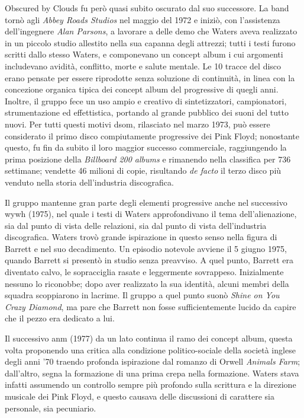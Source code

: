 \documentclass[class=book, crop=false, oneside, 12pt]{standalone}
\begin{document}
    Obscured by Clouds fu però quasi subito oscurato dal suo successore. La band tornò agli \emph{Abbey Roads Studios} nel maggio del 1972 e iniziò, con l'assistenza dell'ingegnere \emph{Alan Parsons}, a lavorare a delle demo che Waters aveva realizzato in un piccolo studio allestito nella sua capanna degli attrezzi; tutti i testi furono scritti dallo stesso Waters, e componevano un concept album i cui argomenti includevano avidità, conflitto, morte e salute mentale. Le 10 tracce del disco erano pensate per essere riprodotte senza soluzione di continuità, in linea con la concezione organica tipica dei concept album del progressive di quegli anni. Inoltre, il gruppo fece un uso ampio e creativo di sintetizzatori, campionatori, strumentazione ed effettistica, portando al grande pubblico dei suoni del tutto nuovi. Per tutti questi motivi \acrfull{dsom}, rilasciato nel marzo 1973, può essere considerato il primo disco compiutamente progressive dei Pink Floyd; nonostante questo, fu fin da subito il loro maggior successo commerciale, raggiungendo la prima posizione della \emph{Billboard 200 albums} e rimanendo nella classifica per 736 settimane; vendette 46 milioni di copie, risultando \emph{de facto} il terzo disco più venduto nella storia dell'industria discografica.

    Il gruppo mantenne gran parte degli elementi progressive anche nel successivo \acrfull{wywh} (1975), nel quale i testi di Waters approfondivano il tema dell'alienazione, sia dal punto di vista delle relazioni, sia dal punto di vista dell'industria discografica. Waters trovò grande ispirazione in questo senso nella figura di Barrett e nel suo decadimento. Un episodio notevole avviene il 5 giugno 1975, quando Barrett si presentò in studio senza preavviso. A quel punto, Barrett era diventato calvo, le sopracciglia rasate e leggermente sovrappeso. Inizialmente nessuno lo riconobbe; dopo aver realizzato la sua identità, alcuni membri della squadra scoppiarono in lacrime. Il gruppo a quel punto suonò \emph{Shine on You Crazy Diamond}, ma pare che Barrett non fosse sufficientemente lucido da capire che il pezzo era dedicato a lui.

    Il successivo \acrlong{anm} (1977) da un lato continua il ramo dei concept album, questa volta proponendo una critica alla condizione politico-sociale della società inglese degli anni '70 traendo profonda ispirazione dal romanzo di Orwell \emph{Animals Farm}; dall'altro, segna la formazione di una prima crepa nella formazione. Waters stava infatti assumendo un controllo sempre più profondo sulla scrittura e la direzione musicale dei Pink Floyd, e questo causava delle discussioni di carattere sia personale, sia pecuniario. 
    
\end{document}

